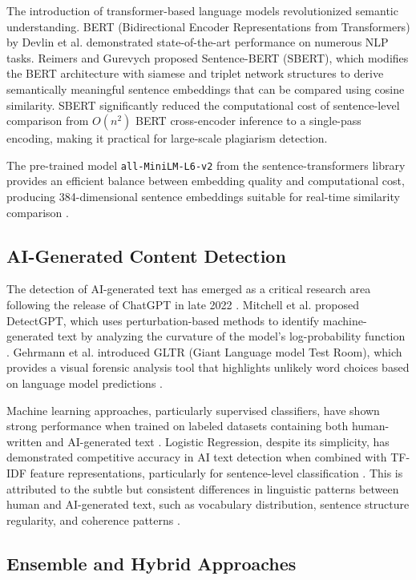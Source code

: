 \documentclass[conference]{IEEEtran}
\begin{document}
The introduction of transformer-based language models revolutionized semantic understanding. BERT (Bidirectional Encoder Representations from Transformers) by Devlin et al. \cite{b18} demonstrated state-of-the-art performance on numerous NLP tasks. Reimers and Gurevych \cite{b19} proposed Sentence-BERT (SBERT), which modifies the BERT architecture with siamese and triplet network structures to derive semantically meaningful sentence embeddings that can be compared using cosine similarity. SBERT significantly reduced the computational cost of sentence-level comparison from $O(n^2)$ BERT cross-encoder inference to a single-pass encoding, making it practical for large-scale plagiarism detection.

The pre-trained model \texttt{all-MiniLM-L6-v2} from the sentence-transformers library provides an efficient balance between embedding quality and computational cost, producing 384-dimensional sentence embeddings suitable for real-time similarity comparison \cite{b20}.

\subsection{AI-Generated Content Detection}

The detection of AI-generated text has emerged as a critical research area following the release of ChatGPT in late 2022 \cite{b21}. Mitchell et al. proposed DetectGPT, which uses perturbation-based methods to identify machine-generated text by analyzing the curvature of the model's log-probability function \cite{b9}. Gehrmann et al. introduced GLTR (Giant Language model Test Room), which provides a visual forensic analysis tool that highlights unlikely word choices based on language model predictions \cite{b22}.

Machine learning approaches, particularly supervised classifiers, have shown strong performance when trained on labeled datasets containing both human-written and AI-generated text \cite{b23}. Logistic Regression, despite its simplicity, has demonstrated competitive accuracy in AI text detection when combined with TF-IDF feature representations, particularly for sentence-level classification \cite{b24}. This is attributed to the subtle but consistent differences in linguistic patterns between human and AI-generated text, such as vocabulary distribution, sentence structure regularity, and coherence patterns \cite{b25}.

\subsection{Ensemble and Hybrid Approaches}
\end{document}
